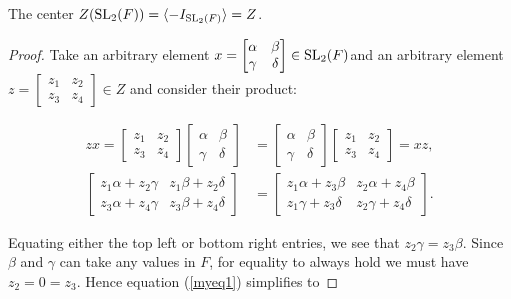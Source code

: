 \begin{lemma}
\label{SpecialSubgroups.center_SL2_eq_Z}
\leanok
The center $Z(\operatorname{SL}_2(F)) = \langle - I_{\operatorname{SL}_2(F)}\rangle = Z$.
\end{lemma}
\begin{proof} 
\leanok
    Take an arbitrary element $x=\begin{bmatrix} \alpha & \beta \\ \gamma & \delta \end{bmatrix} \in \operatorname{SL}_2(F)$and  an arbitrary element $z = \begin{bmatrix} z_1 & z_2 \\ z_3 & z_4 \end{bmatrix} \in Z$ and consider their product:

\begin{align}\label{myeq1} zx = \begin{bmatrix} z_1 & z_2 \\ z_3 & z_4 \end{bmatrix} \begin{bmatrix} \alpha & \beta \\ \gamma & \delta \end{bmatrix} &= \begin{bmatrix} \alpha & \beta \\ \gamma & \delta \end{bmatrix} \begin{bmatrix} z_1 & z_2 \\ z_3 & z_4 \end{bmatrix} = xz, \nonumber \\[1.5ex]
\begin{bmatrix} z_1 \alpha + z_2 \gamma & z_1 \beta + z_2 \delta \\ z_3 \alpha + z_4 \gamma & z_3 \beta + z_4 \delta \end{bmatrix} &= \begin{bmatrix} z_1 \alpha + z_3 \beta & z_2 \alpha + z_4 \beta \\ z_1 \gamma + z_3 \delta & z_2 \gamma + z_4 \delta \end{bmatrix}.
\end{align}

\noindent Equating either the top left or bottom right entries, we see that $z_2 \gamma = z_3 \beta$. Since $\beta$ and $\gamma$ can take any values in $F$, for equality to always hold we must have $z_2 = 0 = z_3$. Hence equation (\ref{myeq1}) simplifies to


\end{proof}
